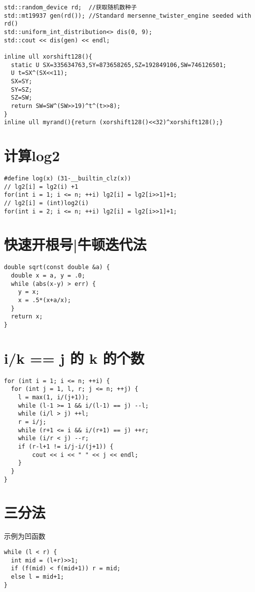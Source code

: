 \documentclass[12pt]{article}
\begin{document}
{{{{{\begin{lstlisting}
std::random_device rd;  //获取随机数种子
std::mt19937 gen(rd()); //Standard mersenne_twister_engine seeded with rd()
std::uniform_int_distribution<> dis(0, 9);
std::cout << dis(gen) << endl;

inline ull xorshift128(){
  static U SX=335634763,SY=873658265,SZ=192849106,SW=746126501;
  U t=SX^(SX<<11);
  SX=SY;
  SY=SZ;
  SZ=SW;
  return SW=SW^(SW>>19)^t^(t>>8);
}
inline ull myrand(){return (xorshift128()<<32)^xorshift128();}
\end{lstlisting}


\section{计算log2}
{\setmainfont{Consolas}
\begin{lstlisting}
#define log(x) (31-__builtin_clz(x))
// lg2[i] = lg2(i) +1
for(int i = 1; i <= n; ++i) lg2[i] = lg2[i>>1]+1;
// lg2[i] = (int)log2(i)
for(int i = 2; i <= n; ++i) lg2[i] = lg2[i>>1]+1;
\end{lstlisting}
\section{快速开根号|牛顿迭代法}
{\setmainfont{Consolas}
\begin{lstlisting}
double sqrt(const double &a) {
  double x = a, y = .0;
  while (abs(x-y) > err) {
    y = x;
    x = .5*(x+a/x);
  }
  return x;
}
\end{lstlisting}

\section{i/k == j 的 k 的个数}
{\setmainfont{Consolas}
\begin{lstlisting}
for (int i = 1; i <= n; ++i) {
  for (int j = 1, l, r; j <= n; ++j) {
    l = max(1, i/(j+1));
    while (l-1 >= 1 && i/(l-1) == j) --l;
    while (i/l > j) ++l;
    r = i/j;
    while (r+1 <= i && i/(r+1) == j) ++r;
    while (i/r < j) --r;
    if (r-l+1 != i/j-i/(j+1)) {
        cout << i << " " << j << endl;
    }
  }
}
\end{lstlisting}

\section{三分法}
示例为凹函数
{\setmainfont{Consolas}
\begin{lstlisting}
while (l < r) {
  int mid = (l+r)>>1;
  if (f(mid) < f(mid+1)) r = mid;
  else l = mid+1;
}


\end{lstlisting}}}}}}}}}}
\end{document}
